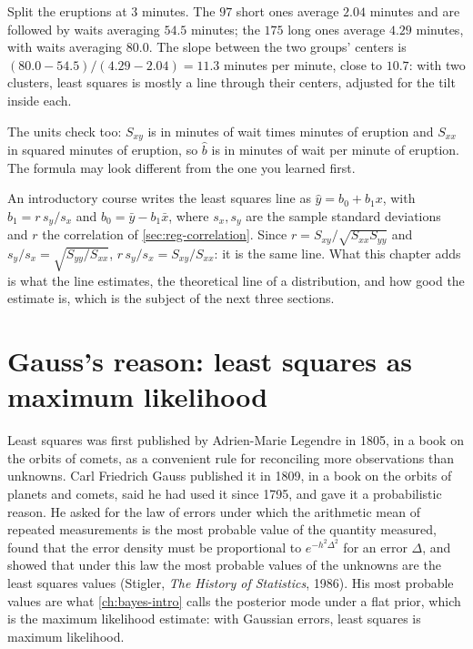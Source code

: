 \begin{sanitycheck}
Split the eruptions at $3$ minutes. The $97$ short ones average $2.04$ minutes and are followed by waits averaging $54.5$ minutes; the $175$ long ones average $4.29$ minutes, with waits averaging $80.0$. The slope between the two groups' centers is $(80.0 - 54.5)/(4.29 - 2.04) = 11.3$ minutes per minute, close to $10.7$: with two clusters, least squares is mostly a line through their centers, adjusted for the tilt inside each.
\end{sanitycheck}

The units check too: $S_{xy}$ is in minutes of wait times minutes of eruption and $S_{xx}$ in squared minutes of eruption, so $\hat{b}$ is in minutes of wait per minute of eruption.
The formula may look different from the one you learned first.

\begin{bridge}
An introductory course writes the least squares line as $\hat{y} = b_0 + b_1x$, with $b_1 = r\,s_y/s_x$ and $b_0 = \bar{y} - b_1\bar{x}$, where $s_x, s_y$ are the sample standard deviations and $r$ the correlation of \cref{sec:reg-correlation}. Since $r = S_{xy}/\sqrt{S_{xx}S_{yy}}$ and $s_y/s_x = \sqrt{S_{yy}/S_{xx}}$, $r\,s_y/s_x = S_{xy}/S_{xx}$: it is the same line. What this chapter adds is what the line estimates, the theoretical line of a distribution, and how good the estimate is, which is the subject of the next three sections.
\end{bridge}

\section{Gauss's reason: least squares as maximum likelihood}
\label{sec:reg-gauss}

Least squares was first published by Adrien-Marie Legendre in 1805, in a book on the orbits of comets, as a convenient rule for reconciling more observations than unknowns.
Carl Friedrich Gauss published it in 1809, in a book on the orbits of planets and comets, said he had used it since 1795, and gave it a probabilistic reason.
He asked for the law of errors under which the arithmetic mean of repeated measurements is the most probable value of the quantity measured, found that the error density must be proportional to $e^{-h^2\Delta^2}$ for an error $\Delta$, and showed that under this law the most probable values of the unknowns are the least squares values (Stigler, \textit{The History of Statistics}, 1986). His most probable values are what \cref{ch:bayes-intro} calls the posterior mode under a flat prior, which is the maximum likelihood estimate: with Gaussian errors, least squares is maximum likelihood.

